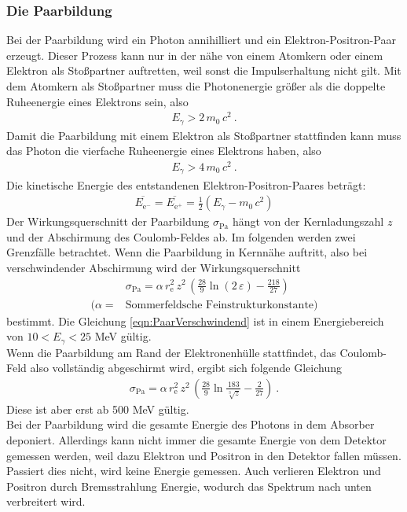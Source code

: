 \subsubsection{Die Paarbildung}
Bei der Paarbildung wird ein Photon annihilliert und ein Elektron-Positron-Paar erzeugt. Dieser Prozess kann nur in der nähe von einem Atomkern oder einem Elektron als Stoßpartner auftretten, weil sonst die Impulserhaltung nicht gilt. Mit dem Atomkern als Stoßpartner muss die Photonenergie größer als die doppelte Ruheenergie eines Elektrons sein, also
\begin{align*}
	E_{\gamma} > 2\,m_0\,c^2 \ .
\end{align*}
Damit die Paarbildung mit einem Elektron als Stoßpartner stattfinden kann muss das Photon die vierfache Ruheenergie eines Elektrons haben, also
\begin{align*}
	E_{\gamma} > 4\,m_0\,c^2 \ .
\end{align*}
Die kinetische Energie des entstandenen Elektron-Positron-Paares beträgt:
\begin{align}
	\overline{E_{\text{e}^-}} = \overline{E_{\text{e}^+}} = \frac{1}{2}(E_{\gamma} - m_0\,c^2)
\end{align}
Der Wirkungsquerschnitt der Paarbildung $\sigma_\text{Pa}$ hängt von der Kernladungszahl $z$ und der Abschirmung des Coulomb-Feldes ab. Im folgenden werden zwei Grenzfälle betrachtet. Wenn die Paarbildung in Kernnähe auftritt, also bei verschwindender Abschirmung wird der Wirkungsquerschnitt
\begin{align}
	&\sigma_\text{Pa} = \alpha\, r_\text{e}^2\, z^2\, \left(\frac{28}{9}\ln(2\,\varepsilon) - \frac{218}{27} \right) \\
	(\alpha = &\text{Sommerfeldsche Feinstrukturkonstante})
	\label{eqn:PaarVerschwindend}
\end{align}
bestimmt. Die Gleichung \eqref{eqn:PaarVerschwindend} ist in einem Energiebereich von $10 < E_\gamma < 25$ MeV gültig. \\
Wenn die Paarbildung am Rand der Elektronenhülle stattfindet, das Coulomb-Feld also vollständig abgeschirmt wird, ergibt sich folgende Gleichung
\begin{align}
	\sigma_\text{Pa} = \alpha\, r_\text{e}^2\, z^2\, \left(\frac{28}{9}\ln\frac{183}{\sqrt[3]{z}} - \frac{2}{27} \right) \ .
\end{align}
Diese ist aber erst ab 500 MeV gültig. \\
Bei der Paarbildung wird die gesamte Energie des Photons in dem Absorber deponiert. Allerdings kann nicht immer die gesamte Energie von dem Detektor gemessen werden, weil dazu Elektron und Positron in den Detektor fallen müssen. Passiert dies nicht, wird keine Energie gemessen. Auch verlieren Elektron und Positron durch Bremsstrahlung Energie, wodurch das Spektrum nach unten verbreitert wird.



